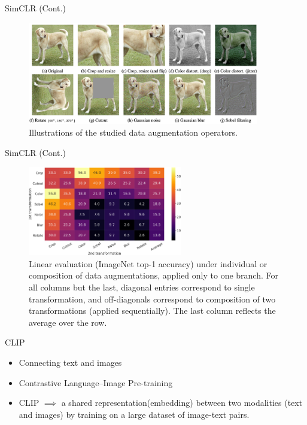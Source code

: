 \documentclass[serif, aspectratio=169]{beamer}
\begin{document}
\begin{frame}{SimCLR (Cont.)}
    \begin{figure}
        \setlength{\abovecaptionskip}{0pt}
        \setlength{\belowcaptionskip}{1pt}
        \centering
        \includegraphics[width=0.9\textwidth]{pic/simclr/6.png}
        \caption{Illustrations of the studied data augmentation operators.}
   \end{figure}
\end{frame}


\begin{frame}{SimCLR (Cont.)}
    \begin{figure}
        \setlength{\abovecaptionskip}{0pt}
        \setlength{\belowcaptionskip}{1pt}
        \centering
        \includegraphics[width=0.6\textwidth]{pic/simclr/7.png}
        \caption{Linear evaluation (ImageNet top-1 accuracy) under individual or composition of data augmentations, applied only to one branch. For all columns but the last, diagonal entries correspond to single transformation, and off-diagonals correspond to composition of two transformations (applied sequentially). The last column reflects the average over the row.}
   \end{figure}
\end{frame}


\begin{frame}{CLIP}
\begin{itemize}
\item Connecting text and images
\item Contrastive Language–Image Pre-training
\item CLIP $\implies$ a shared representation(embedding) between two modalities (text and images) by training on a large dataset of image-text pairs.
\end{itemize}
\end{frame}
\end{document}
